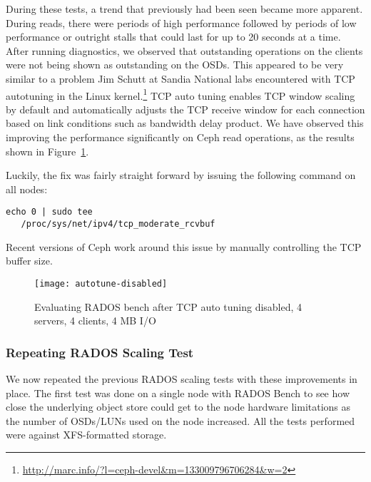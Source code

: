 During these tests, a trend that previously had been seen became more apparent.
During reads, there were periods of high performance followed by periods of low
performance or outright stalls that could last for up to 20 seconds at a time.
After running diagnostics, we observed that outstanding operations on the
clients were not being shown as outstanding on the OSDs.  This appeared to be
very similar to a problem Jim Schutt at Sandia National labs encountered with
TCP autotuning in the Linux
kernel.\footnote{\url{http://marc.info/?l=ceph-devel&m=133009796706284&w=2}}
TCP auto tuning enables TCP window scaling by default and automatically adjusts
the TCP receive window for each connection based on link conditions such as
bandwidth delay product. We have observed this improving the performance
significantly on Ceph read operations, as the results shown in
Figure~\ref{fig:rados-tcp-auto-disabled}.


Luckily, the fix was fairly straight forward by issuing the following command
on all nodes:

\begin{Verbatim}[fontsize=\small]
 echo 0 | sudo tee 
   /proc/sys/net/ipv4/tcp_moderate_rcvbuf
\end{Verbatim}

Recent versions of Ceph work around this issue by manually controlling the TCP
buffer size.  

\begin{figure}[htb]
\centering
\texttt{[image: autotune-disabled]}
\caption{Evaluating RADOS bench after TCP auto tuning disabled, 4 servers, 4
clients, 4 MB I/O}
\label{fig:rados-tcp-auto-disabled}
\end{figure}




\subsubsection{Repeating RADOS Scaling Test}

We now repeated the previous RADOS scaling tests with these improvements in place.
The first test was done on a single node with RADOS Bench to see how close the
underlying object store could get to the node hardware limitations as the number
of OSDs/LUNs used on the node increased. All the tests performed were against
XFS-formatted storage.

